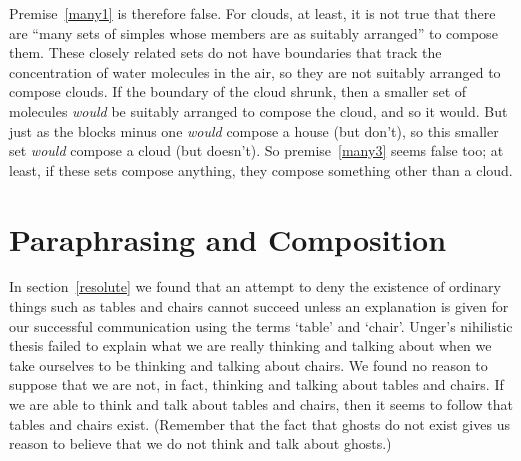 \documentclass[11pt]{article}
\begin{document}
\begin{spacing}{1.5}
Premise~\ref{many1} is therefore false. For clouds, at least, it is not true that there are ``many sets of simples whose members are as suitably arranged'' to compose them. These closely related sets do not have boundaries that track the concentration of water molecules in the air, so they are not suitably arranged to compose clouds. If the boundary of the cloud shrunk, then a smaller set of molecules {\em would} be suitably arranged to compose the cloud, and so it would. But just as the blocks minus one {\em would} compose a house (but don't), so this smaller set {\em would} compose a cloud (but doesn't). So premise~\ref{many3} seems false too; at least, if these sets compose anything, they compose something other than a cloud.



\section{Paraphrasing and Composition}
In section~\ref{resolute} we found that an attempt to deny the existence of ordinary things such as tables and chairs cannot succeed unless an explanation is given for our successful communication using the terms `table' and `chair'. Unger's nihilistic thesis failed to explain what we are really thinking and talking about when we take ourselves to be thinking and talking about chairs. We found no reason to suppose that we are not, in fact, thinking and talking about tables and chairs. If we are able to think and talk about tables and chairs, then it seems to follow that tables and chairs exist. (Remember that the fact that ghosts do not exist gives us reason to believe that we do not think and talk about ghosts.)


\end{spacing}
\end{document}
